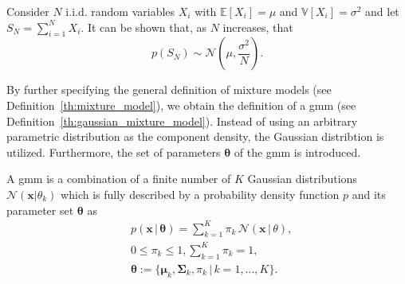 \documentclass[../../../main.tex]{subfiles}
\begin{document}
\begin{theorem}\label{th:central_limit} \cite[p.241]{montgomery_2010}
Consider $N$ i.i.d. random variables $X_i$ with $\mathbb{E}[X_i]=\mu$ and $\mathbb{V}[X_i]=\sigma^2$ and let $S_N=\sum^N_{i=1}X_i$. It can be shown that, as $N$ increases, that
\begin{equation*}
    p(S_N) \sim \mathcal{N}\left(\mu, \frac{\sigma^2}{N}\right).
\end{equation*}
\end{theorem}

By further specifying the general definition of mixture models (see Definition~\ref{th:mixture_model}), we obtain the definition of a \gls{gmm} (see Definition~\ref{th:gaussian_mixture_model}). Instead of using an arbitrary parametric distribution as the component density, the Gaussian distribtion is utilized. Furthermore, the set of parameters $\bm{\theta}$ of the \gls{gmm} is introduced.

\begin{definition}\label{def:gmm} \cite[p. 315]{dei_2020}\label{th:gaussian_mixture_model}
A \acrlong{gmm} is a combination of a finite number of $K$ Gaussian distributions $\mathcal{N}(\bm{x}|\theta_k)$ which is fully described by a probability density function $p$ and its parameter set $\bm{\theta}$ as
\begin{equation}\label{eq:gmm_def}
    \begin{aligned}
        &p(\bm{x} \, | \, \bm{\theta}) = \sum\limits_{k=1}^K \pi_k \, \mathcal{N}(\bm{x} \, | \, \theta), \\
        &0 \leq \pi_k \leq 1, \sum\limits_{k=1}^K \pi_k = 1, \\
        &\bm{\theta} := \{\bm{\mu}_k, \bm{\Sigma}_k, \pi_k \, | \, k = 1, \dots, K \}.
    \end{aligned}
\end{equation}
\end{definition}
\end{document}
